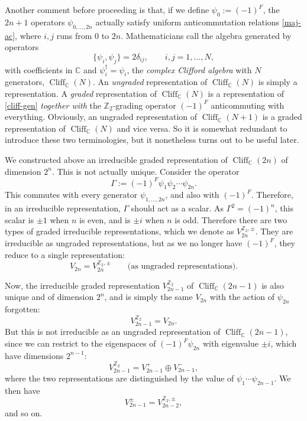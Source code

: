 \documentclass[12pt]{article}
\numberwithin{equation}{section}
\numberwithin{figure}{section}
\theoremstyle{remark}
\def\bC{\mathbb{C}}
\def\bZ{\mathbb{Z}}
\def\Cliff{\mathop{\mathrm{Cliff}}\nolimits}
\begin{document}
Another comment before proceeding is that, if we define
$\psi_0:=(-1)^F$, the $2n+1$ operators $\psi_{0,\ldots, 2n}$ actually satisfy
uniform anticommutation relations \eqref{maj-ac},
where $i,j$ runs from $0$ to $2n$.
Mathematicians call the algebra generated by operators \begin{equation}
\{\psi_i,\psi_j\}=2\delta_{ij},\qquad i,j=1,\ldots,N, \label{cliff-gen}
\end{equation} with coefficients in $\bC$ and $\psi_i^\dagger=\psi_i$,
the \emph{complex Clifford algebra} with $N$ generators, $\Cliff_\bC(N)$.
An \emph{ungraded} representation of $\Cliff_\bC(N)$ is simply a representation.
A \emph{graded} representation of $\Cliff_\bC(N)$ is a representation of 
\eqref{cliff-gen} \emph{together with} the $\bZ_2$-grading operator $(-1)^F$
anticommuting with everything.
Obviously, an ungraded representation of $\Cliff_\bC(N+1)$ 
is a graded representation of $\Cliff_\bC(N)$ and vice versa.
So it is somewhat redundant to introduce these two terminologies,
but it  nonetheless turns out to be useful later.

We constructed above an irreducible graded representation  of $\Cliff_\bC(2n)$ of dimension $2^n$.
This is not actually unique. Consider the operator \begin{equation}
\Gamma:=(-1)^F \psi_1\psi_2 \cdots \psi_{2n}.
\end{equation}
This commutes with every generator $\psi_{1,\ldots,2n}$, and also with $(-1)^F$.
Therefore, in an irreducible representation, $\Gamma$ should act as a scalar.
As  $\Gamma^2=(-1)^n$, this scalar is $\pm1$ when $n$ is even, and is $\pm i$ when $n$ is odd.
Therefore there are two types of graded  irreducible representations,
which we denote as $V_{2n}^{\bZ_2,\pm}$.
They are irreducible as ungraded representations, but as we no longer have $(-1)^F$,
they reduce to a single representation:
 \begin{equation}
V_{2n}=V_{2n}^{\bZ_{2},\pm} \qquad \text{(as ungraded representations)}.
\end{equation}

Now, the irreducible graded representation $V_{2n-1}^{\bZ_2}$ of $\Cliff_\bC(2n-1)$ 
is also unique and  of dimension $2^n$, and is simply the same $V_{2n}$ 
with the action of $\psi_{2n}$ forgotten: \begin{equation}
V_{2n-1}^{\bZ_2}=V_{2n}.
\end{equation}
But this is not irreducible as an ungraded representation of $\Cliff_\bC(2n-1)$,
since we can restrict to the eigenspaces of $(-1)^F \psi_{2n}$ with eigenvalue $\pm i$,
which have dimensions $2^{n-1}$: \begin{equation}
V_{2n-1}^{\bZ_2} = V_{2n-1}^+ \oplus V_{2n-1}^-,
\end{equation} where the two representations are distinguished by the value of 
$\psi_1\cdots \psi_{2n-1}$.
We then have \begin{equation}
V_{2n-1}^\pm = V_{2n-2}^{\bZ_2,\pm},
\end{equation} and so on.
\end{document}
